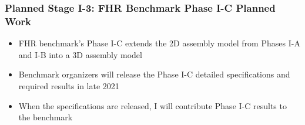 \begin{frame}
    \frametitle{Planned Stage I-3: FHR Benchmark Phase I-C Planned Work}
        \begin{itemize}
            \item FHR benchmark's Phase I-C extends the 2D assembly model from 
            Phases I-A and I-B into a 3D assembly model
            \item Benchmark organizers will release the Phase I-C detailed 
            specifications and required results in late 2021
            \item When the specifications are released, I will contribute Phase I-C
            results to the benchmark
        \end{itemize}
\end{frame}